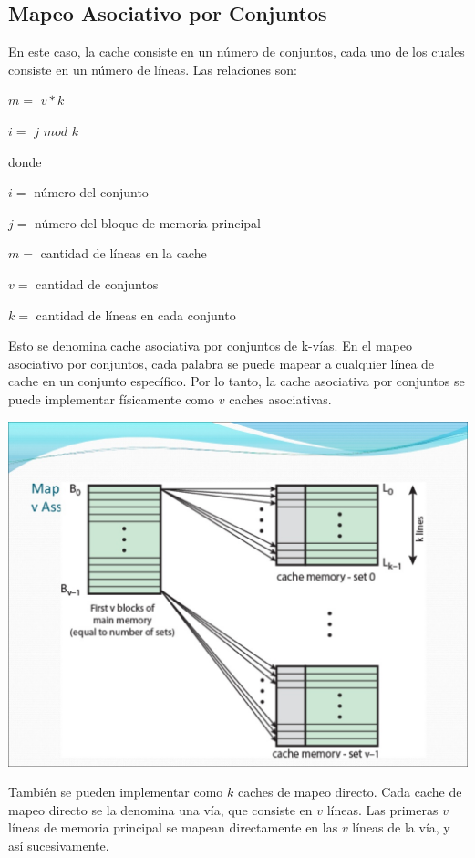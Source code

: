\subsection{Mapeo Asociativo por Conjuntos}

En este caso, la cache consiste en un n\'umero de conjuntos, cada uno de los cuales consiste en un n\'umero de l\'ineas. Las 
relaciones son: 

$m = $ $v*k$ 

$i =$ $j$ $mod$ $k$

donde

$i =$ n\'umero del conjunto

$j =$ n\'umero del bloque de memoria principal

$m =$ cantidad de l\'ineas en la cache

$v =$ cantidad de conjuntos

$k =$ cantidad de l\'ineas en cada conjunto

Esto se denomina cache asociativa por conjuntos de k-v\'ias. En el mapeo asociativo por conjuntos, cada palabra se puede mapear
a cualquier l\'inea de cache en un conjunto espec\'ifico. Por lo tanto, la cache asociativa por conjuntos se puede implementar 
f\'isicamente como $v$ caches asociativas. 


\begin{center}
\includegraphics[scale=0.3]{./Graficos/asociativa_por_conjuntos.jpg} 
\end{center}

Tambi\'en se pueden implementar como $k$ caches de mapeo directo. Cada cache de mapeo directo se la denomina una v\'ia, que consiste
en $v$ l\'ineas. Las primeras $v$ l\'ineas de memoria principal se mapean directamente en las $v$ l\'ineas de la v\'ia, y as\'i sucesivamente.


